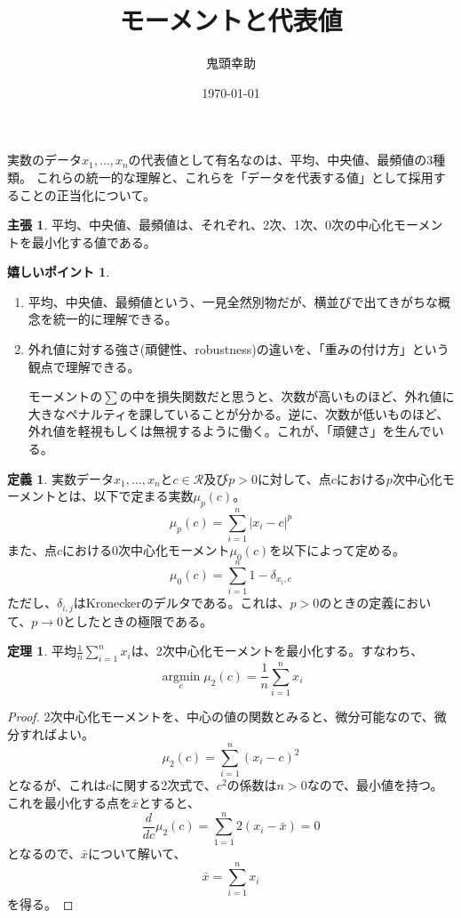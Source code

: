 \documentclass{jsarticle}
\title{モーメントと代表値}
\author{鬼頭幸助}
\date{\today}
\theoremstyle{definition}
\newtheorem*{theorem}{定理}
\newtheorem*{point}{嬉しいポイント}
\newtheorem*{definition}{定義}
\newtheorem*{claim}{主張}
\newcommand{\argmin}{\mathop{\mathrm{argmin}}\limits}
\begin{document}
\maketitle

実数のデータ$x_1,\dots,x_n$の代表値として有名なのは、平均、中央値、最頻値の3種類。
これらの統一的な理解と、これらを「データを代表する値」として採用することの正当化について。

\begin{claim}
平均、中央値、最頻値は、それぞれ、2次、1次、0次の中心化モーメントを最小化する値である。
\end{claim}

\begin{point}
  \begin{enumerate}
    \item 平均、中央値、最頻値という、一見全然別物だが、横並びで出てきがちな概念を統一的に理解できる。
    \item 外れ値に対する強さ(頑健性、robustness)の違いを、「重みの付け方」という観点で理解できる。

    モーメントの$\sum$の中を損失関数だと思うと、次数が高いものほど、外れ値に大きなペナルティを課していることが分かる。逆に、次数が低いものほど、外れ値を軽視もしくは無視するように働く。これが、「頑健さ」を生んでいる。
  \end{enumerate}
\end{point}

\begin{definition}
  実数データ$x_1,\dots,x_n$と$c \in \mathcal{R}$及び$p>0$に対して、点$c$における$p$次中心化モーメントとは、以下で定まる実数$\mu_p(c)$。
  \[
    \mu_p(c)=\sum_{i=1}^n|x_i-c|^p
  \]
  また、点$c$における$0$次中心化モーメント$\mu_0(c)$を以下によって定める。
  \[
    \mu_0(c)=\sum_{i=1}^n1-\delta_{x_i,c}
  \]
  ただし、$\delta_{i,j}$はKroneckerのデルタである。これは、$p>0$のときの定義において、$p \to 0$としたときの極限である。
\end{definition}

\begin{theorem}
  平均$\frac{1}{n}\sum_{i=1}^nx_i$は、2次中心化モーメントを最小化する。すなわち、
  \[
    \argmin_c\mu_2(c)=\frac{1}{n}\sum_{i=1}^nx_i
  \]
\end{theorem}
\begin{proof}
  2次中心化モーメントを、中心の値の関数とみると、微分可能なので、微分すればよい。
  \[
    \mu_2(c)=\sum_{i=1}^n(x_i-c)^2
  \]
  となるが、これは$c$に関する2次式で、$c^2$の係数は$n>0$なので、最小値を持つ。これを最小化する点を$\bar{x}$とすると、
  \[
    \frac{d}{dc}\mu_2(c)=\sum_{1=1}^n2(x_i-\bar{x})=0
  \]
  となるので、$\bar{x}$について解いて、
  \[
    \bar{x}=\sum_{i=1}^nx_i
  \]
  を得る。
\end{proof}
\end{document}
